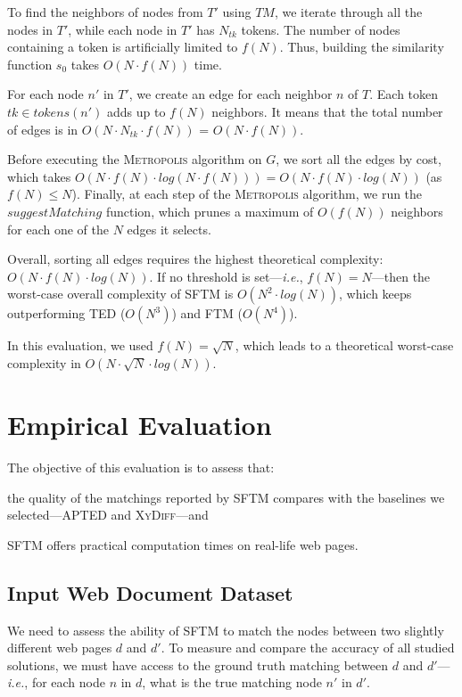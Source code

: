 To find the neighbors of nodes from $T'$ using $TM$, we iterate through all the nodes in $T'$, while each node in $T'$ has $N_{tk}$ tokens.
The number of nodes containing a token is artificially limited to $f(N)$.
Thus, building the similarity function $s_0$ takes $O(N \cdot f(N))$ time.

For each node $n'$ in $T'$, we create an edge for each neighbor $n$ of $T$.
Each token $tk \in tokens(n')$ adds up to $f(N)$ neighbors.
It means that the total number of edges is in $O(N \cdot N_{tk} \cdot f(N))$ = $O(N \cdot f(N))$.

Before executing the \textsc{Metropolis} algorithm on $G$, we sort all the edges by cost, which takes $O(N \cdot f(N) \cdot log(N \cdot f(N))) = O(N \cdot f(N) \cdot log(N))$ (as $f(N) \leq N$).
Finally, at each step of the \textsc{Metropolis} algorithm, we run the $suggestMatching$ function, which prunes a maximum of $O(f(N))$ neighbors for each one of the $N$ edges it selects.

Overall, sorting all edges requires the highest theoretical complexity: $O(N \cdot f(N) \cdot log(N))$.
If no threshold is set---\emph{i.e.}, $f(N) = N$---then the worst-case overall complexity of SFTM is $O(N^2 \cdot log(N))$, which keeps outperforming TED ($O(N^3)$) and FTM ($O(N^4)$).

In this evaluation, we used $f(N) = \sqrt{N}$, which leads to a theoretical worst-case complexity in $O(N \cdot \sqrt{N} \cdot log(N))$.

\section{Empirical Evaluation}\label{sftm:sec:evaluation}
The objective of this evaluation is to assess that:
\begin{compactenum}
	\item the quality of the matchings reported by SFTM compares with the baselines we selected---APTED and \textsc{XyDiff}---and
    \item SFTM offers practical computation times on real-life web pages.
\end{compactenum}

\subsection{Input Web Document Dataset}
We need to assess the ability of SFTM to match the nodes between two slightly different web pages $d$ and $d'$.
To measure and compare the accuracy of all studied solutions, we must have access to the ground truth matching between $d$ and $d'$---\emph{i.e.}, for each node $n$ in $d$, what is the true matching node $n'$ in $d'$.


